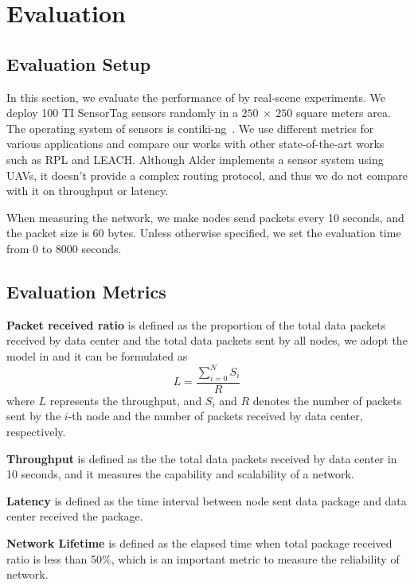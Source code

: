 \section{Evaluation}
\label{Eva}

\subsection{Evaluation Setup} In this section, we evaluate the performance of {\sdn}
by real-scene experiments. We deploy 100 TI
SensorTag sensors randomly in a $250~\times~250$ square meters area. 
The operating system of sensors is contiki-ng~\cite{}. We use different metrics for various
applications and compare our works with other state-of-the-art works such as RPL
and LEACH. Although Alder implements a sensor system using UAVs, it doesn't
provide a complex routing protocol, and thus we do not compare with it on
throughput or latency.

When measuring the network, we make nodes send packets every 10 seconds, and the
packet size is 60 bytes. Unless otherwise specified, we set the evaluation time
from 0 to 8000 seconds.

\subsection{Evaluation Metrics}

\textbf{Packet received ratio} is defined as the proportion of the total data
packets received by data center and the total data packets sent by all nodes, 
we adopt the model in \cite{chen2017energy}
and it can be formulated as
\begin{equation}
	L = \frac{\sum_{i = 0}^{N}S_i}{R}
\end{equation}
where $L$ represents the throughput, and $S_i$ and $R$ denotes the number of
packets sent by the $i$-th node and the number of packets received by data
center, respectively.

\textbf{Throughput} is defined as the the total data packets received by data
center in 10 seconds, and it measures the capability and scalability of a network. 

\textbf{Latency} is defined as the time interval between node sent data package and
data center received the package.

\textbf{Network Lifetime} is defined as the elapsed time when total package
received ratio is less than 50\%, which is an important metric to measure the
reliability of network.

